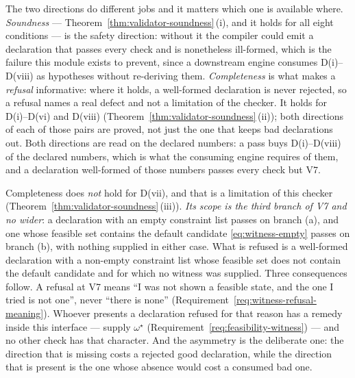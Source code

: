 
\begin{remark}
\label{rem:completeness}
The two directions do different jobs and it matters which one is available
where. \emph{Soundness} --- Theorem~\ref{thm:validator-soundness}\,(i), and it holds for all
eight conditions --- is the safety direction: without it the compiler could
emit a declaration that passes every check and is nonetheless ill-formed, which
is the failure this module exists to prevent, since a downstream engine
consumes D(i)--D(viii) as hypotheses without re-deriving them. \emph{Completeness}
is what makes a \emph{refusal} informative: where it holds, a well-formed
declaration is never rejected, so a refusal names a real defect and not a
limitation of the checker. It holds for D(i)--D(vi) and D(viii)
(Theorem~\ref{thm:validator-soundness}\,(ii)); both directions of each of those pairs are
proved, not just the one that keeps bad declarations out. Both directions
are read on the declared numbers: a pass buys D(i)--D(viii) of the declared
numbers, which is what the consuming engine requires of them, and a
declaration well-formed of those numbers passes every check but V7.

Completeness does \emph{not} hold for D(vii), and that is a limitation of
this checker (Theorem~\ref{thm:validator-soundness}\,(iii)). \emph{Its scope is the third
branch of V7 and no wider}: a declaration with an empty constraint list
passes on branch (a), and one whose feasible set contains the default
candidate \eqref{eq:witness-empty} passes on branch (b), with nothing supplied
in either case. What is refused is a well-formed declaration with a non-empty
constraint list whose feasible set does not contain the default candidate and
for which no witness was supplied. Three consequences follow. A refusal at V7
means ``I was not shown a feasible state, and the one I tried is not one'',
never ``there is none'' (Requirement~\ref{req:witness-refusal-meaning}).
Whoever presents a declaration refused for that reason has a remedy inside
this interface --- supply $\omega^{\star}$
(Requirement~\ref{req:feasibility-witness}) --- and no other check has that
character. And the asymmetry is the deliberate one: the direction that is
missing costs a rejected good declaration, while the direction that is present
is the one whose absence would cost a consumed bad one.
\end{remark}
